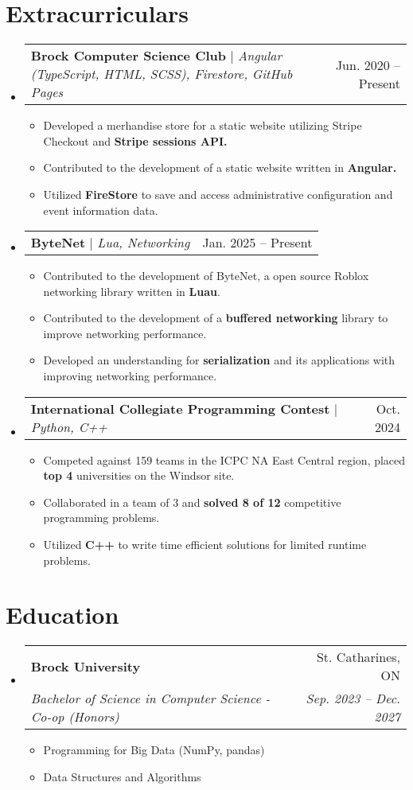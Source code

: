 \documentclass[letterpaper,11pt]{article}
\makeatletter
\newcommand{\resumeItem}[1]{
  \item\small{
    {#1 \vspace{-2pt}}
  }
}
\newcommand{\resumeSubheading}[4]{
  \vspace{-2pt}\item
    \begin{tabular*}{0.97\textwidth}[t]{l@{\extracolsep{\fill}}r}
      \textbf{#1} & #2 \\
      \textit{\small#3} & \textit{\small #4} \\
    \end{tabular*}\vspace{-7pt}
}
\newcommand{\resumeProjectHeading}[2]{
    \item
    \begin{tabular*}{0.97\textwidth}{l@{\extracolsep{\fill}}r}
      \small#1 & #2 \\
    \end{tabular*}\vspace{-7pt}
}
\newcommand{\resumeSubHeadingListStart}{\begin{itemize}[leftmargin=0.15in, label={}]}
\newcommand{\resumeSubHeadingListEnd}{\end{itemize}}
\newcommand{\resumeItemListStart}{\begin{itemize}}
\newcommand{\resumeItemListEnd}{\end{itemize}\vspace{-5pt}}
\makeatother
\begin{document}
\section{Extracurriculars}
    \resumeSubHeadingListStart
      \resumeProjectHeading
          {\textbf{Brock Computer Science Club} $|$ \emph{Angular (TypeScript, HTML, SCSS), Firestore, GitHub Pages}}{Jun. 2020 -- Present}
          \resumeItemListStart
            \resumeItem{Developed a merhandise store for a static website utilizing Stripe Checkout and \textbf{Stripe sessions API.}}
            \resumeItem{Contributed to the development of a static website written in \textbf{Angular.}}
            \resumeItem{Utilized \textbf{FireStore} to save and access administrative configuration and event information data.}
          \resumeItemListEnd
      \resumeProjectHeading
        {\textbf{ByteNet} $|$ \emph{Lua, Networking}}{Jan. 2025 -- Present}
        \resumeItemListStart
          \resumeItem{Contributed to the development of ByteNet, a open source Roblox networking library written in \textbf{Luau}.}
          \resumeItem{Contributed to the development of a \textbf{buffered networking} library to improve networking performance.}
          \resumeItem{Developed an understanding for \textbf{serialization} and its applications with improving networking performance.}
        \resumeItemListEnd
      \resumeProjectHeading
          {\textbf{International Collegiate Programming Contest} $|$ \emph{Python, C++}}{Oct. 2024}
          \resumeItemListStart
            \resumeItem{Competed against 159 teams in the ICPC NA East Central region, placed \textbf{top 4} universities on the Windsor site.}
            \resumeItem{Collaborated in a team of 3 and \textbf{solved 8 of 12} competitive programming problems.}
            \resumeItem{Utilized \textbf{C++} to write time efficient solutions for limited runtime problems.}
          \resumeItemListEnd
    \resumeSubHeadingListEnd
%

\section{Education}
  \resumeSubHeadingListStart
    \resumeSubheading
      {Brock University}{St. Catharines, ON}
      {Bachelor of Science in Computer Science - Co-op (Honors)}{Sep. 2023 -- Dec. 2027}
    \resumeItemListStart
      \resumeItem{Programming for Big Data (NumPy, pandas)}
      \resumeItem{Data Structures and Algorithms}
    \resumeItemListEnd
  \resumeSubHeadingListEnd
%
\end{document}
